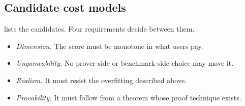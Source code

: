 \subsection{Candidate cost models}\label{subsec:cost-candidates}

 lists the candidates. Four requirements decide between them.
\begin{itemize}[nosep]
\item \emph{Dimension.} The score must be monotone in what users pay.
\item \emph{Ungameability.} No prover-side or benchmark-side choice may move it.
\item \emph{Realism.} It must resist the overfitting described above.
\item \emph{Provability.} It must follow from a theorem whose proof technique exists.
\end{itemize}

